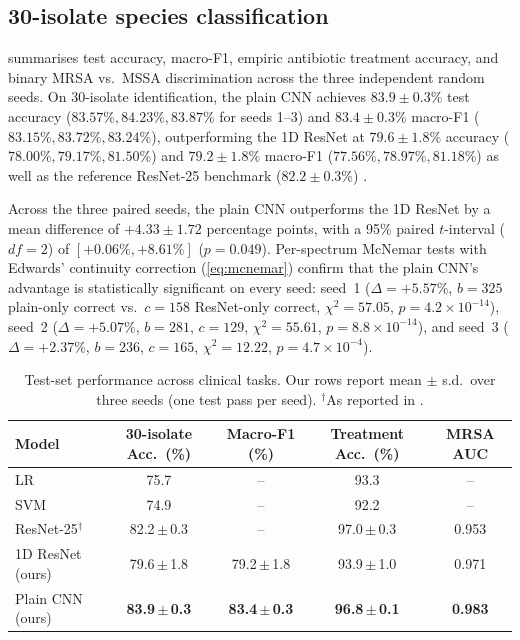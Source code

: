 \documentclass[journal,onecolumn]{IEEEtran}
\begin{document}
\subsection{30-isolate species classification}
\label{sec:res-isolate}
 summarises test accuracy, macro-F1, empiric antibiotic
treatment accuracy, and binary MRSA vs.\ MSSA discrimination across the three
independent random seeds. On 30-isolate identification, the plain CNN achieves
$83.9 \pm 0.3\%$ test accuracy ($83.57\%, 84.23\%, 83.87\%$ for seeds 1--3)
and $83.4 \pm 0.3\%$ macro-F1 ($83.15\%, 83.72\%, 83.24\%$), outperforming the
1D ResNet at $79.6 \pm 1.8\%$ accuracy ($78.00\%, 79.17\%, 81.50\%$) and
$79.2 \pm 1.8\%$ macro-F1 ($77.56\%, 78.97\%, 81.18\%$) as well as the
reference ResNet-25 benchmark ($82.2 \pm 0.3\%$) \cite{ho2019rapid}.

Across the three paired seeds, the plain CNN outperforms the 1D ResNet by a
mean difference of $+4.33 \pm 1.72$ percentage points, with a 95\% paired
$t$-interval ($df=2$) of $[+0.06\%, +8.61\%]$ ($p=0.049$). Per-spectrum
McNemar tests with Edwards' continuity correction (\cref{eq:mcnemar}) confirm
that the plain CNN's advantage is statistically significant on every seed:
seed~1 ($\Delta = +5.57\%$, $b=325$ plain-only correct vs.\ $c=158$ ResNet-only
correct, $\chi^2 = 57.05$, $p = 4.2 \times 10^{-14}$),
seed~2 ($\Delta = +5.07\%$, $b=281$, $c=129$, $\chi^2 = 55.61$,
$p = 8.8 \times 10^{-14}$), and
seed~3 ($\Delta = +2.37\%$, $b=236$, $c=165$, $\chi^2 = 12.22$,
$p = 4.7 \times 10^{-4}$).

\begin{table}[!t]
  \centering
  \caption{Test-set performance across clinical tasks. Our rows report mean $\pm$ s.d.\ over
  three seeds (one test pass per seed).
  $^\dagger$As reported in \cite{ho2019rapid}.}
  \label{tab:main}
  \begin{tabular}{@{}l c c c c@{}}
    \toprule
    Model & 30-isolate Acc.\ (\%) & Macro-F1 (\%) & Treatment Acc.\ (\%) & MRSA AUC \\
    \midrule
    LR \cite{ho2019rapid}                  & 75.7            & --              & 93.3            & -- \\
    SVM \cite{ho2019rapid}                 & 74.9            & --              & 92.2            & -- \\
    ResNet-25$^\dagger$ \cite{ho2019rapid} & 82.2\,$\pm$\,0.3 & --              & 97.0\,$\pm$\,0.3 & 0.953 \\
    \midrule
    1D ResNet (ours)                       & 79.6\,$\pm$\,1.8 & 79.2\,$\pm$\,1.8 & 93.9\,$\pm$\,1.0 & 0.971 \\
    Plain CNN (ours)                       & \textbf{83.9\,$\pm$\,0.3} & \textbf{83.4\,$\pm$\,0.3} & \textbf{96.8\,$\pm$\,0.1} & \textbf{0.983} \\
    \bottomrule
  \end{tabular}
\end{table}
\end{document}
